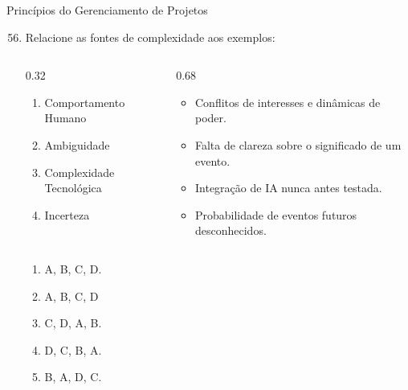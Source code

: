 \documentclass{beamer}
\begin{document}
\begin{frame}{Princípios do Gerenciamento de Projetos}
	\begin{enumerate}
		\setcounter{enumi}{55}
		\justifying
		\item Relacione as fontes de complexidade aos exemplos:
		\begin{columns}
			\begin{column}{0.32\textwidth}
				\begin{enumerate}[A]
					\item Comportamento Humano
					\item Ambiguidade
					\item Complexidade Tecnológica
					\item Incerteza
				\end{enumerate}
			\end{column}
			\begin{column}{0.68\textwidth}
				\begin{itemize}
					\item Conflitos de interesses e dinâmicas de poder.
					\item Falta de clareza sobre o significado de um evento.
					\item Integração de IA nunca antes testada.
					\item Probabilidade de eventos futuros desconhecidos.
				\end{itemize}
			\end{column}
		\end{columns}
		\begin{enumerate}[a]
			\item A, B, C, D.
			\item \alert<2>{A, B, C, D}
			\item C, D, A, B.
			\item D, C, B, A.
			\item B, A, D, C.
		\end{enumerate}
	\end{enumerate}
\end{frame}
\end{document}

